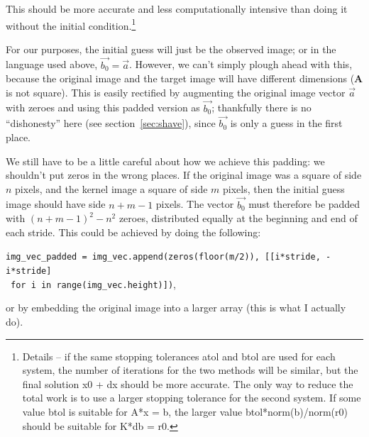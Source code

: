 \documentclass[letterpaper, 11pt]{article}
\begin{document}
This should be more accurate and less computationally intensive than doing it without the initial condition.\footnote{Details -- if the same stopping tolerances atol and btol are used for each system, the number of iterations for the two methods will be similar, but the final solution x0 + dx should be more accurate. The only way to reduce the total work is to use a larger stopping tolerance for the second system. If some value btol is suitable for A*x = b, the larger value btol*norm(b)/norm(r0) should be suitable for K*db = r0.}

For our purposes, the initial guess will just be the observed image; or in the language used above, $\vec{b_0}=\vec{a}$. However, we can't simply plough ahead with this, because the original image and the target image will have different dimensions ($\mathbf A$ is not square). This is easily rectified by augmenting the original image vector $\vec a$ with zeroes and using this padded version as $\vec{b_0}$; thankfully there is no ``dishonesty'' here (see section~\ref{sec:shave}), since $\vec{b_0}$ is only a guess in the first place.

We still have to be a little careful about how we achieve this padding: we shouldn't put zeros in the wrong places. If the original image was a square of side $n$ pixels, and the kernel image a square of side $m$ pixels, then the initial guess image should have side $n+m-1$ pixels. The vector $\vec{b_0}$ must therefore be padded with $(n+m-1)^2-n^2$ zeroes, distributed equally at the beginning and end of each stride. This could be achieved by doing the following:

\texttt{img\_vec\_padded = img\_vec.append(zeros(floor(m/2)), [[i*stride, -i*stride] }\\~\mbox{}\hspace{10cm}\texttt{for i in range(img\_vec.height)])},

or by embedding the original image into a larger array (this is what I actually do).
\end{document}
